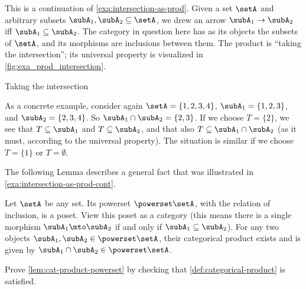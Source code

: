 \begin{example}\label{exa:intersection-as-prod-cont}
This is a continuation of \cref{exa:intersection-as-prod}.
Given a set $\setA$ and arbitrary subsets $\subA_1, \subA_2 \subseteq \setA$, we drew an arrow $\subA_1 \to \subA_2$ iff $\subA_1 \subseteq \subA_2$. The category in question here has as its objects the subsets of $\setA$, and its morphisms are inclusions between them. The product is ``taking the intersection''; its universal property is visualized in \cref{fig:exa_prod_intersection}.
  \begin{marginfigure}
  \begin{center}
  \end{center}
    \caption{Taking the intersection}
    \label{fig:exa_prod_intersection_cont}
  \end{marginfigure}
 As a concrete example, consider again $\setA = \{ 1, 2, 3, 4 \}$, $\subA_1 = \{ 1, 2, 3 \}$, and $\subA_2 = \{2, 3, 4 \}$. So $\subA_1 \cap \subA_2 = \{2, 3 \}$. If we choose $T = \{ 2 \}$, we see that $T \subseteq \subA_1$ and $T \subseteq \subA_2$, and that also $T \subseteq \subA_1 \cap \subA_2$ (as it must, according to the universal property). The situation is similar if we choose $T = \{ 1\}$ or $T = \emptyset$.
\end{example}

The following Lemma describes a general fact that was illustrated in \cref{exa:intersection-as-prod-cont}.
\begin{lemma}\label{lem:cat-product-powerset}
Let $\setA$ be any set. Its powerset $\powerset \setA$, with the relation of inclusion, is a poset. View this poset as a category (this means there is a single morphism $\subA_1 \mto \subA_2$ if and only if $\subA_1 \subseteq \subA_2$). For any two objects $\subA_1, \subA_2 \in \powerset \setA$, their categorical product exists and is given by $\subA_1 \cap \subA_2 \in \powerset \setA$.
\end{lemma}

\begin{gradedexercise}\label{ex:CatProductPowerset}
Prove \cref{lem:cat-product-powerset} by checking that \cref{def:categorical-product} is satisfied.
\end{gradedexercise}


